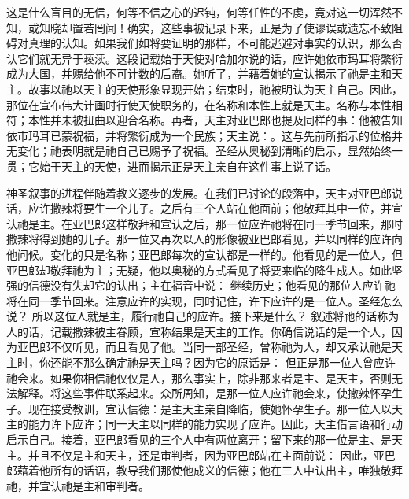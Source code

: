 这是什么盲目的无信，何等不信之心的迟钝，何等任性的不虔，竟对这一切浑然不知，或知晓却置若罔闻！确实，这些事被记录下来，正是为了使谬误或遗忘不致阻碍对真理的认知。如果我们如将要证明的那样，不可能逃避对事实的认识，那么否认它们就无异于亵渎。这段记载始于天使对哈加尔说的话，应许她依市玛耳将繁衍成为大国，并赐给他不可计数的后裔。她听了，并藉着她的宣认揭示了祂是主和天主。故事以祂以天主的天使形象显现开始；结束时，祂被明认为天主自己。因此，那位在宣布伟大计画时行使天使职务的，在名称和本性上就是天主。名称与本性相符；本性并未被扭曲以迎合名称。再者，天主对亚巴郎也提及同样的事：他被告知依市玛耳已蒙祝福，并将繁衍成为一个民族；天主说：。这与先前所指示的位格并无变化；祂表明就是祂自己已赐予了祝福。圣经从奥秘到清晰的启示，显然始终一贯；它始于天主的天使，进而揭示正是天主亲自在这件事上说了话。\par

神圣叙事的进程伴随着教义逐步的发展。在我们已讨论的段落中，天主对亚巴郎说话，应许撒辣将要生一个儿子。之后有三个人站在他面前；他敬拜其中一位，并宣认祂是主。在亚巴郎这样敬拜和宣认之后，那一位应许祂将在同一季节回来，那时撒辣将得到她的儿子。那一位又再次以人的形像被亚巴郎看见，并以同样的应许向他问候。变化的只是名称；亚巴郎每次的宣认都是一样的。他看见的是一位人，但亚巴郎却敬拜祂为主；无疑，他以奥秘的方式看见了将要来临的降生成人。如此坚强的信德没有失却它的认出；主在福音中说： 继续历史；他看见的那位人应许祂将在同一季节回来。注意应许的实现，同时记住，许下应许的是一位人。圣经怎么说？ 所以这位人就是主，履行祂自己的应许。接下来是什么？ 叙述将祂的话称为人的话，记载撒辣被主眷顾，宣称结果是天主的工作。你确信说话的是一个人，因为亚巴郎不仅听见，而且看见了他。当同一部圣经，曾称祂为人，却又承认祂是天主时，你还能不那么确定祂是天主吗？因为它的原话是： 但正是那一位人曾应许祂会来。如果你相信祂仅仅是人，那么事实上，除非那来者是主、是天主，否则无法解释。将这些事件联系起来。众所周知，是那一位人应许祂会来，使撒辣怀孕生子。现在接受教训，宣认信德：是主天主亲自降临，使她怀孕生子。那一位人以天主的能力许下应许；同一天主以同样的能力实现了应许。因此，天主借言语和行动启示自己。接着，亚巴郎看见的三个人中有两位离开；留下来的那一位是主、是天主。并且不仅是主和天主，还是审判者，因为亚巴郎站在主面前说： 因此，亚巴郎藉着他所有的话语，教导我们那使他成义的信德；他在三人中认出主，唯独敬拜祂，并宣认祂是主和审判者。\par

